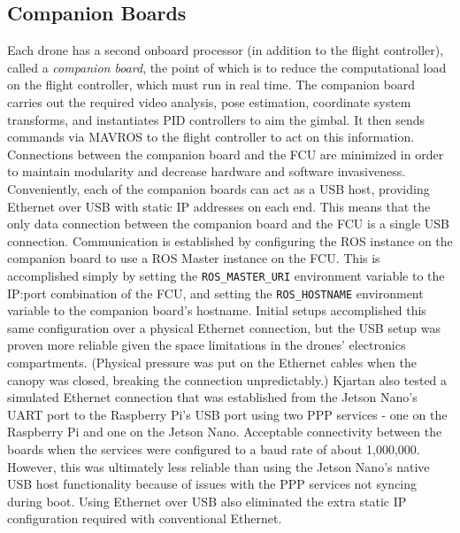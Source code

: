 \subsection{Companion Boards}

Each drone has a second onboard processor (in addition to the flight controller), called a \textit{companion board}, the point of which is to reduce the computational load on the flight controller, which must run in real time. The companion board carries out the required video analysis, pose estimation, coordinate system transforms, and instantiates PID controllers to aim the gimbal. It then sends commands via MAVROS to the flight controller to act on this information. Connections between the companion board and the FCU are minimized in order to maintain modularity and decrease hardware and software invasiveness. Conveniently, each of the companion boards can act as a USB host, providing Ethernet over USB with static IP addresses on each end. This means that the only data connection between the companion board and the FCU is a single USB connection. Communication is established by configuring the ROS instance on the companion board to use a ROS Master instance on the FCU. This is accomplished simply by setting the \texttt{ROS\_MASTER\_URI} environment variable to the IP:port combination of the FCU, and setting the \texttt{ROS\_HOSTNAME} environment variable to the companion board's hostname. Initial setups accomplished this same configuration over a physical Ethernet connection, but the USB setup was proven more reliable given the space limitations in the drones' electronics compartments. (Physical pressure was put on the Ethernet cables when the canopy was closed, breaking the connection unpredictably.) Kjartan also tested a simulated Ethernet connection that was established from the Jetson Nano's UART port to the Raspberry Pi's USB port using two PPP services - one on the Raspberry Pi and one on the Jetson Nano. Acceptable connectivity between the boards when the services were configured to a baud rate of about 1,000,000. However, this was ultimately less reliable than using the Jetson Nano's native USB host functionality because of issues with the PPP services not syncing during boot. Using Ethernet over USB also eliminated the extra static IP configuration required with conventional Ethernet.

